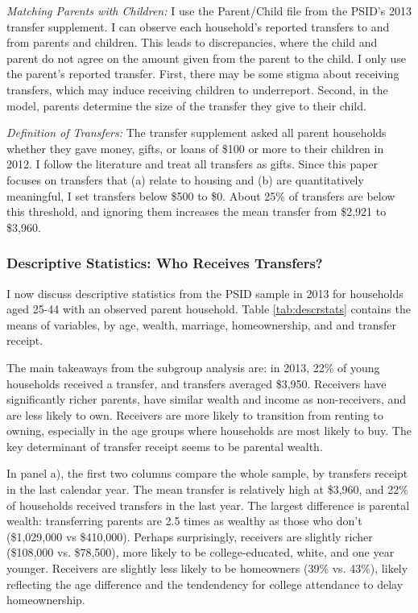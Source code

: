 \documentclass[12pt]{article}
\begin{document}
\textit{Matching Parents with Children:}  I use the Parent/Child file from the PSID's 2013 transfer supplement. I can observe each household's reported transfers to and from parents and children. This leads to discrepancies, where the child and parent do not agree on the amount given from the parent to the child. I only use the parent's reported transfer. First, there may be some stigma about receiving transfers, which may induce receiving children to underreport. Second, in the model, parents determine the size of the transfer they give to their child. 

\textit{Definition of Transfers:} The transfer supplement asked all parent households whether they gave money, gifts, or loans of \$100 or more to their children in 2012. I follow the literature \citep[e.g.,][]{mcgarry2016dynamic} and treat all transfers as gifts. Since this paper focuses on transfers that (a) relate to housing and (b) are quantitatively meaningful, I set transfers below \$500 to \$0. About 25\% of transfers are below this threshold, and ignoring them increases the mean transfer from \$2,921 to \$3,960.

\subsubsection{Descriptive Statistics: Who Receives Transfers?}
I now discuss descriptive statistics from the PSID sample in 2013 for households aged 25-44 with an observed parent household. Table \ref{tab:descrstats} contains the means of variables, by age, wealth, marriage, homeownership, and and transfer receipt.  

The main takeaways from the subgroup analysis are: in 2013, 22\% of young households received a transfer, and transfers averaged \$3,950. Receivers have significantly richer parents, have similar wealth and income as non-receivers, and are less likely to own. Receivers are more likely to transition from renting to owning, especially in the age groups where households are most likely to buy. The key determinant of transfer receipt seems to be parental wealth.

In panel a), the first two columns compare the whole sample, by transfers receipt in the last calendar year. The mean transfer is relatively high at \$3,960, and  22\% of households received transfers in the last year. The largest difference is parental wealth: transferring parents are 2.5 times as wealthy as those who don't (\$1,029,000 vs \$410,000). Perhaps surprisingly, receivers are slightly richer (\$108,000 vs. \$78,500), more likely to be college-educated, white, and one year younger. Receivers are slightly less likely to be homeowners (39\% vs. 43\%), likely reflecting the age difference and the tendendency for college attendance to delay homeownership.
\end{document}
